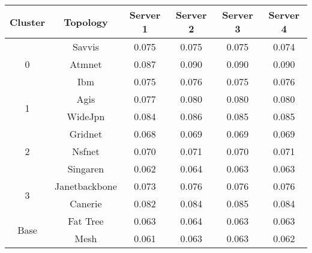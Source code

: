 \begin{tabular}{cccccc}
\toprule
Cluster & Topology & Server 1 & Server 2 & Server 3 & Server 4 \\
\midrule
\multirow{3}{*}{0}& Savvis & 0.075 & 0.075 & 0.075 & 0.074 \\
& Atmnet & 0.087 & 0.090 & 0.090 & 0.090 \\
& Ibm & 0.075 & 0.076 & 0.075 & 0.076 \\ \hline
\multirow{2}{*}{1}& Agis & 0.077 & 0.080 & 0.080 & 0.080 \\
& WideJpn & 0.084 & 0.086 & 0.085 & 0.085 \\ \hline
\multirow{3}{*}{2}& Gridnet & 0.068 & 0.069 & 0.069 & 0.069 \\
& Nsfnet & 0.070 & 0.071 & 0.070 & 0.071 \\
& Singaren & 0.062 & 0.064 & 0.063 & 0.063 \\ \hline
\multirow{2}{*}{3}& Janetbackbone & 0.073 & 0.076 & 0.076 & 0.076 \\
& Canerie & 0.082 & 0.084 & 0.085 & 0.084 \\ \hline\multirow{2}{*}{Base}& Fat Tree & 0.063 & 0.064 & 0.063 & 0.063 \\
& Mesh & 0.061 & 0.063 & 0.063 & 0.062 \\

\bottomrule
\end{tabular}
